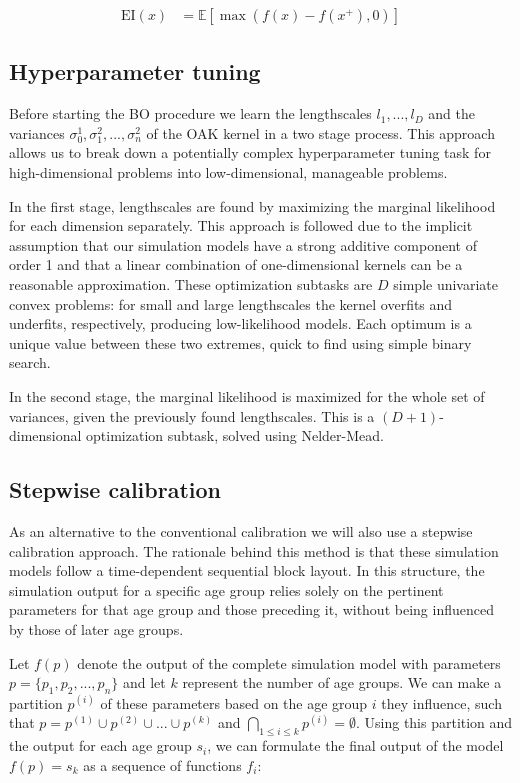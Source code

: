 \documentclass[sn-mathphys,Numbered]{sn-jnl}%
\begin{document}
\begin{equation} \label{eq:expected-improvement}
	\begin{aligned}
		\text{EI}(x) &= \mathbb{E}[\max(f(x)-f(x^+), 0)]
	\end{aligned}
\end{equation}

\subsection{Hyperparameter tuning}

Before starting the BO procedure we learn the lengthscales $l_1, ..., l_D$ and the variances $\sigma_0^1, \sigma_1^2, ..., \sigma_n^2$ of the OAK kernel in a two stage process. This approach allows us to break down a potentially complex hyperparameter tuning task for high-dimensional problems into low-dimensional, manageable problems.

In the first stage, lengthscales are found by maximizing the marginal likelihood for each dimension separately. This approach is followed due to the implicit assumption that our simulation models have a strong additive component of order 1 and that a linear combination of one-dimensional kernels can be a reasonable approximation. These optimization subtasks are $D$ simple univariate convex problems: for small and large lengthscales the kernel overfits and underfits, respectively, producing low-likelihood models. Each optimum is a unique value between these two extremes, quick to find using simple binary search.

In the second stage, the marginal likelihood is maximized for the whole set of variances, given the previously found lengthscales. This is a $(D+1)$-dimensional optimization subtask, solved using Nelder-Mead\cite{nelder-mead}.

\subsection{Stepwise calibration}
As an alternative to the conventional calibration we will also use a stepwise calibration approach. The rationale behind this method is that these simulation models follow a time-dependent sequential block layout. In this structure, the simulation output for a specific age group relies solely on the pertinent parameters for that age group and those preceding it, without being influenced by those of later age groups.

Let $f(p)$ denote the output of the complete simulation model with parameters $p = \{p_1, p_2, ..., p_n\}$ and let $k$ represent the number of age groups. We can make a partition $p^{(i)}$ of these parameters based on the age group $i$ they influence, such that $p = p^{(1)} \cup p^{(2)} \cup ... \cup p^{(k)}$ and $\underset{1\leq i \leq k}{\bigcap} p^{(i)} = \emptyset$. Using this partition and the output for each age group $s_i$, we can formulate the final output of the model $f(p) = s_k$ as a sequence of functions $f_i$:
\end{document}
